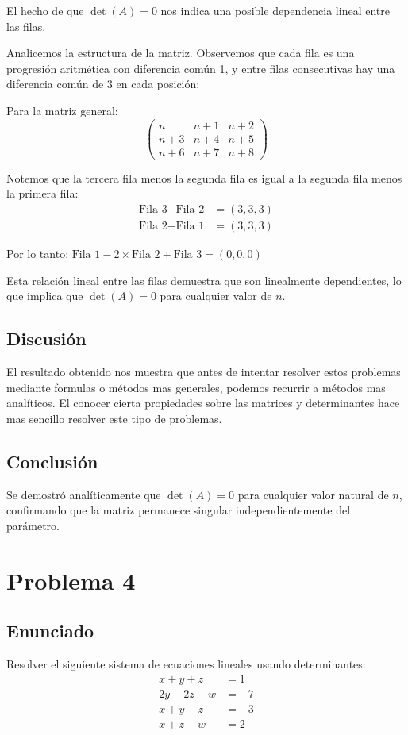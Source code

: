 \documentclass{article}
\begin{document}
El hecho de que $\det(A) = 0$ nos indica una posible dependencia lineal entre las filas.

Analicemos la estructura de la matriz. Observemos que cada fila es una progresión aritmética con diferencia común 1, y entre filas consecutivas hay una diferencia común de 3 en cada posición:

Para la matriz general:
$$\begin{pmatrix}
n & n+1 & n+2 \\
n+3 & n+4 & n+5 \\
n+6 & n+7 & n+8
\end{pmatrix}$$

Notemos que la tercera fila menos la segunda fila es igual a la segunda fila menos la primera fila:
\begin{align}
\text{Fila 3} - \text{Fila 2} &= (3, 3, 3) \\
\text{Fila 2} - \text{Fila 1} &= (3, 3, 3)
\end{align}

Por lo tanto: $\text{Fila 1} - 2 \times \text{Fila 2} + \text{Fila 3} = (0, 0, 0)$

Esta relación lineal entre las filas demuestra que son linealmente dependientes, lo que implica que $\det(A) = 0$ para cualquier valor de $n$.

\subsection{Discusión}
El resultado obtenido nos muestra que antes de intentar resolver estos problemas mediante formulas o métodos mas generales, podemos recurrir a métodos mas analíticos. El conocer cierta propiedades sobre las matrices y determinantes hace mas sencillo resolver este tipo de problemas.

\subsection{Conclusión}
Se demostró analíticamente que $\det(A) = 0$ para cualquier valor natural de $n$, confirmando que la matriz permanece singular independientemente del parámetro.

\section{Problema 4}

\subsection{Enunciado}
Resolver el siguiente sistema de ecuaciones lineales usando determinantes:
\begin{align}
x + y + z &= 1 \\
2y - 2z - w &= -7 \\
x + y - z &= -3 \\
x + z + w &= 2
\end{align}
\end{document}

